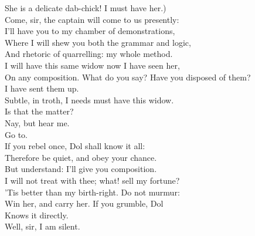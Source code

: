 \documentclass[a4paper,oneside,12pt]{memoir}
\begin{document}
\begin{drama*}
She is a delicate dab-chick! I must have her.)\\
\subtlespeaks {} Come, sir, the captain will come to us presently:\\
I'll have you to my chamber of demonstrations,\\
Where I will shew you both the grammar and logic,\\
And rhetoric of quarrelling: my whole method.\\
\facespeaks I will have this same widow now I have seen her,\\
On any composition.
\subtlespeaks {} What do you say?
\facespeaks Have you disposed of them?\\
\subtlespeaks {} I have sent them up.\\
\facespeaks Subtle, in troth, I needs must have this widow.\\
\subtlespeaks Is that the matter?\\
\facespeaks {} Nay, but hear me.\\
\subtlespeaks {} Go to.\\
If you rebel once, Dol shall know it all:\\
Therefore be quiet, and obey your chance.\\
\facespeaks But understand: I'll give you composition.\\
\subtlespeaks I will not treat with thee; what! sell my fortune?\\
'Tis better than my birth-right. Do not murmur:\\
Win her, and carry her. If you grumble, Dol\\
Knows it directly.\\
\facespeaks {} Well, sir, I am silent.\\

\scene


\end{drama*}
\end{document}
